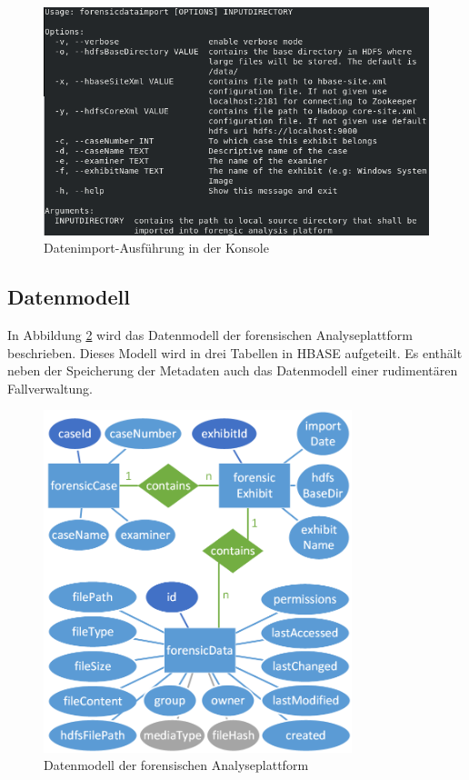 \begin{figure}[ht]
  \centering
  \includegraphics[width=\textwidth]{./resource/data_import_console_command.png}
  \caption{Datenimport-Ausführung in der Konsole}
  \label{fig:data_import_console_params}
\end{figure} 


\subsection{Datenmodell}
\label{subsec:data_import_data_model}

In Abbildung \ref{fig:hbase_data_model} wird das Datenmodell der forensischen Analyseplattform beschrieben. Dieses Modell wird in drei Tabellen in HBASE aufgeteilt. 
Es enthält neben der Speicherung der Metadaten auch das Datenmodell einer rudimentären Fallverwaltung.\\

\begin{figure}[ht]
  \centering
  \includegraphics[width=0.8\textwidth]{./resource/hbase_data_model.png}
  \caption{Datenmodell der forensischen Analyseplattform}
  \label{fig:hbase_data_model}
\end{figure}

